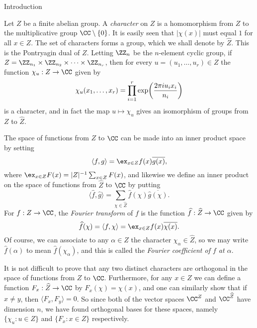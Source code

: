 


\def\FF{{\bf F}}
\def\TT{{\bf T}}
\def\bar{\overline}
\def\hat{\widehat}
\def\norm#1{|\!|#1|\!|}
\def\bignorm#1{\big|\!\big|#1\big|\!\big|}
\def\Norm#1{\Big|\!\Big|#1\Big|\!\Big|}
\def\normm#1{\bigg|\!\bigg|#1\bigg|\!\bigg|}
\def\supp{\op{{\rm supp}}}
\def\sgn{\op{{\rm sgn}}}
\def\smallsupp{\op{{\sevenrm supp}}}
\def\divides{\backslash}
\def\del{\partial}

\widemargins
{}


\bigskip

\advsect Introduction

Let $Z$ be a finite abelian group. A {\it character} on $Z$ is a homomorphism from $Z$ to the multiplicative
group $\CC\setminus \{0\}$. It is easily seen that $|\chi(x)|$ must equal $1$ for all $x\in Z$.
The set of characters forms a group, which we shall denote by $\hat Z$. This is the Pontryagin dual of $Z$.
Letting $\ZZ_n$ be the $n$-element cyclic group,
if $Z = \ZZ_{n_1}\times \ZZ_{n_2} \times\cdots\times \ZZ_{n_r}$, then for every $u = (u_1,\ldots,u_r)\in Z$
the function $\chi_u : Z\to \CC$ given by
$$\chi_u(x_1,\ldots,x_r) = \prod_{i=1}^r \exp\biggl( {2\pi i u_i x_i\over n_i} \biggr)$$
is a character, and in fact the map $u\mapsto \chi_u$ gives an isomorphism of groups from $Z$ to $\hat Z$.

The space of functions from $Z$ to $\CC$ can be made into an inner product space by setting
$$\langle f,g\rangle = \ex_{x\in Z} f(x)\bar{g(x)},$$
where $\ex_{x\in Z} F(x) = |Z|^{-1} \sum_{x\in Z} F(x)$, and likewise we define an inner product on
the space of functions from $\hat Z$ to $\CC$ by putting
$$\langle \hat f, \hat g\rangle = \sum_{\chi \in \hat Z} \hat f(\chi) \bar{\hat g(\chi)}.$$
For $f:Z\to \CC$, the {\it Fourier transform} of $f$ is the function $\hat f : \hat Z\to \CC$ given by
$$ \hat f(\chi) = \langle f,\chi\rangle
= \ex_{x\in Z} f(x) \bar{\chi(x)}.$$
Of course, we can associate to any $\alpha\in Z$ the character $\chi_\alpha\in \hat Z$, so we may write
$\hat f(\alpha)$ to mean $\hat f(\chi_\alpha)$, and this is called the {\it Fourier coefficient
of $f$ at $\alpha$}.

It is not difficult to prove that any two distinct characters are orthogonal in the space
of functions from $Z$ to $\CC$. Furthermore, for any $x\in Z$ we can define a function $F_x : \hat Z\to \CC$
by $F_x(\chi) = \chi(x)$, and one can similarly show that if $x\ne y$, then $\langle F_x, F_y\rangle = 0$.
So since both of the vector spaces $\CC^Z$ and $\CC^{\hat Z}$ have dimension $n$, we have found orthogonal
bases for these spaces, namely $\{\chi_u : u\in Z\}$ and $\{F_x : x\in Z\}$ respectively.

